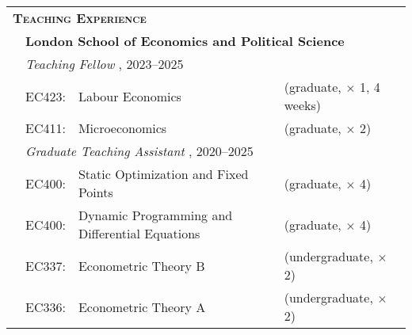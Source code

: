 \begin{tabular}{llll}
	
	\multicolumn{3}{l}{
		\large
		\textbf{%
			\textsc{%
				Teaching Experience
			}
		}
	}
	\\[2ex]
	
	\indent
	
	
	&
	\multicolumn{3}{l}{
		\textbf{%
			London School of Economics and Political Science
		}
	}
	\\[1ex]
	
	
	&
	\multicolumn{3}{l}{
		\textit{%
			Teaching Fellow%
		}%
		,
		2023--2025
	}
	\\[.5ex]
	
	& EC423:
	& Labour Economics
	& (graduate, $\times$ 1, 4 weeks)
	\\
	
	& EC411:
	& Microeconomics
	& (graduate, $\times$ 2)
	\\[1.5ex]
	
	
	&
	\multicolumn{3}{l}{
		\textit{%
			Graduate Teaching Assistant%
		}%
		,
		2020--2025
	}
	\\[.5ex]
	
	& EC400:
	& Static Optimization and Fixed Points
	& (graduate, $\times$ 4)
%	
	\\
	
	& EC400:
	& Dynamic Programming and Differential Equations
	& (graduate, $\times$ 4)
	\\
	
	& EC337:
	& Econometric Theory B
	& (undergraduate, $\times$ 2)
	\\%
	
	& EC336:
	& Econometric Theory A
	& (undergraduate, $\times$ 2)
	\\%
	
\end{tabular}


